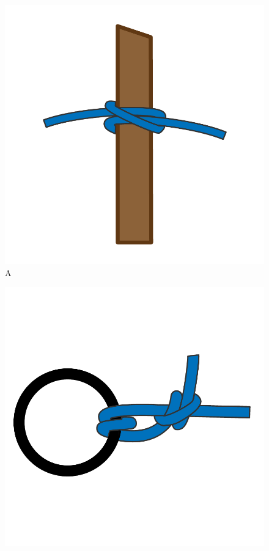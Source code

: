 
\begin{figure}[H]
	\centering
	\begin{minipage}[b]{0.23\textwidth}
		\includegraphics[width=\textwidth]{Hoofdstukken/Schiemannen/pdf/mastworp.pdf}
		\centering
		A
	\end{minipage}
	\hfill
	\begin{minipage}[b]{0.23\textwidth}
		\includegraphics[width=\textwidth]{Hoofdstukken/Schiemannen/pdf/dubble_halve_steek.pdf}

\end{minipage}
\end{figure}
